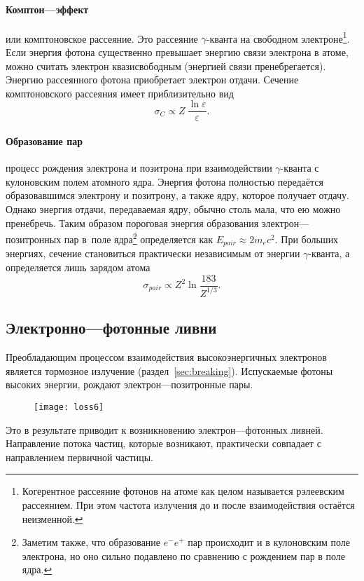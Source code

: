 \paragraph{Комптон---эффект} или комптоновское рассеяние. Это рассеяние
$\gamma$-кванта на свободном электроне\footnote{Когерентное рассеяние
фотонов на атоме как целом называется рэлеевским рассеянием. При этом
частота излучения до и после взаимодействия остаётся неизменной.}.
Если энергия фотона существенно превышает энергию связи электрона
в атоме, можно считать электрон квазисвободным (энергией связи
пренебрегается). Энергию рассеянного фотона приобретает электрон отдачи.
Сечение комптоновского рассеяния имеет приблизительно вид
\[
\sigma_{C}\propto Z~\frac{\ln\varepsilon}{\varepsilon}.
\]
\paragraph{Образование пар} процесс рождения электрона и
позитрона при взаимодействии $\gamma$-кванта с кулоновским полем
атомного ядра. Энергия фотона полностью передаётся образовавшимся
электрону и позитрону, а также ядру, которое получает отдачу. Однако
энергия отдачи, передаваемая ядру, обычно столь мала, что ею можно
пренебречь. Таким образом пороговая энергия образования
электрон---позитронных пар в~поле ядра\footnote{Заметим также, что
образование $e^- e^+$ пар происходит и в кулоновским поле электрона, но
оно сильно подавлено по сравнению с рождением пар в поле ядра.}
определяется как $E_{pair}\approx2m_ec^2$. При больших энергиях, сечение
становиться практически независимым от энергии $\gamma$-кванта, а
определяется лишь зарядом атома
\[
\sigma_{pair}\propto Z^2\ln\frac{183}{Z^{1/3}}.
\]

\subsection{Электронно---фотонные ливни}
\label{sec:showers}
Преобладающим процессом взаимодействия высокоэнергичных электронов
является тормозное излучение (раздел~\ref{sec:breaking}).
Испускаемые фотоны высоких энергии, рождают электрон---позитронные
пары.
\begin{figure}[h]\center
  \texttt{[image: loss6]}
\end{figure}
Это в результате приводит к возникновению электрон---фотонных
ливней. Направление потока частиц, которые возникают, практически
совпадает с направлением первичной частицы.

